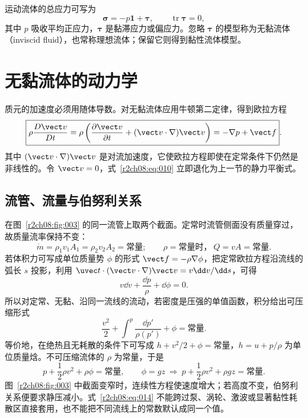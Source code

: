 运动流体的总应力可写为
\begin{equation}
 \boldsymbol\sigma=-p\boldsymbol 1+\boldsymbol\tau,
 \qquad \operatorname{tr}\boldsymbol\tau=0,
 \label{r2ch08:eq:009}
\end{equation}
其中 $p$ 吸收平均正应力，$\boldsymbol\tau$ 是黏滞应力或偏应力。忽略 $\boldsymbol\tau$ 的模型称为无黏流体（inviscid fluid），也常称理想流体；保留它则得到黏性流体模型。

\section{无黏流体的动力学}
\label{r2ch08:sec:euler}

质元的加速度必须用随体导数。对无黏流体应用牛顿第二定律，得到欧拉方程
\begin{equation}
 \boxed{\rho\frac{D\vect v}{Dt}
 =\rho\left(\frac{\partial\vect v}{\partial t}+(\vect v\cdot\nabla)\vect v\right)
 =-\nabla p+\vect f}.
 \label{r2ch08:eq:010}
\end{equation}
其中 $(\vect v\cdot\nabla)\vect v$ 是对流加速度，它使欧拉方程即使在定常条件下仍然是非线性的。令 $\vect v=0$，式~\eqref{r2ch08:eq:010} 立即退化为上一节的静力平衡式。

\subsection{流管、流量与伯努利关系}
\label{r2ch08:subsec:bernoulli}

在图~\ref{r2ch08:fig:003} 的同一流管上取两个截面。定常时流管侧面没有质量穿过，故质量流率保持不变：
\begin{equation}
 \dot m=\rho_1v_1A_1=\rho_2v_2A_2=\text{常量};
 \qquad \rho=\text{常量时，}\ Q=vA=\text{常量}.
 \label{r2ch08:eq:011}
\end{equation}
若体积力可写成单位质量势 $\phi$ 的形式 $\vect f=-\rho\nabla\phi$，把定常欧拉方程沿流线的弧长 $s$ 投影，利用 $\uvec t\cdot(\vect v\cdot\nabla)\vect v=v\dd v/\dd s$，可得
\begin{equation}
 v\dd v+\frac{\dd p}{\rho}+\dd\phi=0.
 \label{r2ch08:eq:012}
\end{equation}
所以对定常、无黏、沿同一流线的流动，若密度是压强的单值函数，积分给出可压缩形式
\begin{equation}
 \boxed{\frac{v^2}{2}+\int^p\frac{\dd p'}{\rho(p')}+\phi=\text{常量}}.
 \label{r2ch08:eq:013}
\end{equation}
等价地，在绝热且无耗散的条件下可写成 $h+v^2/2+\phi=\text{常量}$，$h=u+p/\rho$ 为单位质量焓。不可压缩流体的 $\rho$ 为常量，于是
\begin{equation}
 \boxed{p+\frac12\rho v^2+\rho\phi=\text{常量}},
 \qquad \phi=gz\ \Longrightarrow\ p+\frac12\rho v^2+\rho gz=\text{常量}.
 \label{r2ch08:eq:014}
\end{equation}
图~\ref{r2ch08:fig:003} 中截面变窄时，连续性方程使速度增大；若高度不变，伯努利关系便要求静压减小。式~\eqref{r2ch08:eq:014} 不能跨过泵、涡轮、激波或显著黏性耗散区直接套用，也不能把不同流线上的常数默认成同一个值。
\figBernoulliTube

